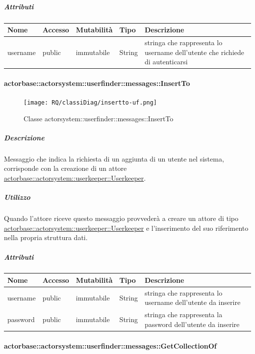\documentclass{scalatekids-article}
\begin{document}
\subparagraph{Attributi}
\begin{tabular}{| p{3cm} | p{1.5cm} | p{2cm} | p{2cm} | p{8.5cm} |}
  \hline
  Nome & Accesso & Mutabilità & Tipo & Descrizione\\
  \hline
  username & public & immutabile & String & stringa che rappresenta lo username dell'utente che richiede di autenticarsi\\
  \hline
\end{tabular}

\paragraph{actorbase::actorsystem::userfinder::messages::InsertTo}
\label{sec:actorbase::actorsystem::userfinder::messages::InsertTo}

\begin{figure}[H]
   \begin{center}
     \texttt{[image: RQ/classiDiag/insertto-uf.png]}
     \caption{Classe actorsystem::userfinder::messages::InsertTo}
   \end{center}
 \end{figure}

\subparagraph{Descrizione}
Messaggio che indica la richiesta di un aggiunta di un utente nel sistema,
corrisponde con la creazione di un attore \hyperref[sec:actorbase::actorsystem::userkeeper::Userkeeper]{actorbase::\allowbreak{}actorsystem::\allowbreak{}userkeeper::\allowbreak{}Userkeeper}.

\subparagraph{Utilizzo}
Quando l'attore riceve questo messaggio provvederà a creare un attore di tipo \hyperref[sec:actorbase::actorsystem::userkeeper::Userkeeper]{actorbase::\allowbreak{}actorsystem::\allowbreak{}userkeeper::\allowbreak{}Userkeeper}
e l'inserimento del suo riferimento nella propria struttura dati.

\subparagraph{Attributi}
\begin{tabular}{| p{3cm} | p{1.5cm} | p{2cm} | p{2cm} | p{8.5cm} |}
  \hline
  Nome & Accesso & Mutabilità & Tipo & Descrizione\\
  \hline
  username & public & immutabile & String & stringa che rappresenta lo username dell'utente da inserire \\
  \hline
  password & public & immutabile & String & stringa che rappresenta la password dell'utente da inserire \\
  \hline
\end{tabular}

\paragraph{actorbase::actorsystem::userfinder::messages::GetCollectionOf}
\label{sec:actorbase::actorsystem::userfinder::messages::GetCollectionOf}
\end{document}
